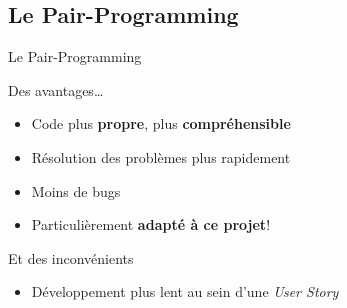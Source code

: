 \FlorentSpeak
\subsection{Le Pair-Programming}
\begin{frame}{Le Pair-Programming}
	\pause
	\begin{exampleblock}{Des avantages…}
		\begin{itemize}
			\item Code plus \textbf{propre}, plus \textbf{compréhensible}
			\item Résolution des problèmes plus rapidement
			\item Moins de bugs
			\item Particulièrement \textbf{adapté à ce projet}!
		\end{itemize}
\end{exampleblock}
	\pause
\vfill
\begin{alertblock}{Et des inconvénients}
\begin{itemize}
	\item Développement plus lent au sein d'une \textit{User Story}
\end{itemize}
\end{alertblock}
\end{frame}
	
